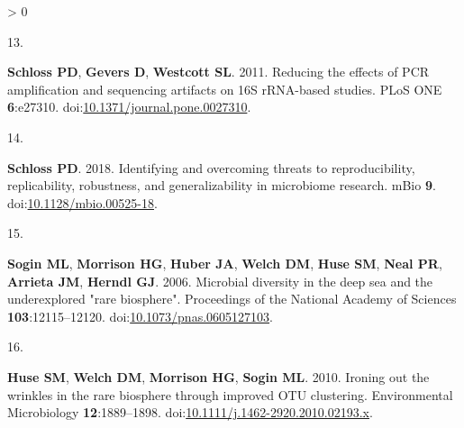 \documentclass[
]{article}
\newlength{\cslhangindent}
\newlength{\csllabelwidth}
\newenvironment{CSLReferences}[3] %
 {%
  \setlength{\parindent}{0pt}
  \ifodd #1 \everypar{\setlength{\hangindent}{\cslhangindent}}\ignorespaces\fi
  \ifnum #2 > 0
  \setlength{\parskip}{#2\baselineskip}
  \fi
 }%
 {}
\newcommand{\CSLLeftMargin}[1]{\parbox[t]{\csllabelwidth}{#1}}
\newcommand{\CSLRightInline}[1]{\parbox[t]{\linewidth - \csllabelwidth}{#1}}
\begin{document}
\begin{CSLReferences}{0}{0}
{{NR}, \textbf{Chia N}, \textbf{Fierer N}, \textbf{White O}, \textbf{Cani
PD}, \textbf{Gajer P}, \textbf{Strandwitz P}, \textbf{Kashyap P},
\textbf{Dutton R}, \textbf{Park RS}, \textbf{Xavier RJ}, \textbf{Mills
RH}, \textbf{Krajmalnik-Brown R}, \textbf{Ley R}, \textbf{Owens SM},
\textbf{Klemmer S}, \textbf{Matamoros S}, \textbf{Mirarab S},
\textbf{Moorman S}, \textbf{Holmes S}, \textbf{Schwartz T},
\textbf{Eshoo-Anton TW}, \textbf{Vigers T}, \textbf{Pandey V},
\textbf{Treuren WV}, \textbf{Fang X}, \textbf{Xu ZZ}, \textbf{Jarmusch
A}, \textbf{Geier J}, \textbf{Reeve N}, \textbf{Silva R},
\textbf{Kopylova E}, \textbf{Nguyen D}, \textbf{Sanders K},
\textbf{Benitez RAS}, \textbf{Heale AC}, \textbf{Abramson M},
\textbf{Waldispühl J}, \textbf{Butyaev A}, \textbf{Drogaris C},
\textbf{Nazarova E}, \textbf{Ball M}, \textbf{Gunderson B}. 2018.
American gut: An open platform for citizen science microbiome research.
{mSystems} \textbf{3}.
doi:\href{https://doi.org/10.1128/msystems.00031-18}{10.1128/msystems.00031-18}.}

\leavevmode\hypertarget{ref-Schloss2011}{}%
\CSLLeftMargin{13. }
\CSLRightInline{\textbf{Schloss PD}, \textbf{Gevers D}, \textbf{Westcott
SL}. 2011. Reducing the effects of {PCR} amplification and sequencing
artifacts on 16S {rRNA}-based studies. {PLoS} {ONE} \textbf{6}:e27310.
doi:\href{https://doi.org/10.1371/journal.pone.0027310}{10.1371/journal.pone.0027310}.}

\leavevmode\hypertarget{ref-Schloss2018}{}%
\CSLLeftMargin{14. }
\CSLRightInline{\textbf{Schloss PD}. 2018. Identifying and overcoming
threats to reproducibility, replicability, robustness, and
generalizability in microbiome research. {mBio} \textbf{9}.
doi:\href{https://doi.org/10.1128/mbio.00525-18}{10.1128/mbio.00525-18}.}

\leavevmode\hypertarget{ref-Sogin2006}{}%
\CSLLeftMargin{15. }
\CSLRightInline{\textbf{Sogin ML}, \textbf{Morrison HG}, \textbf{Huber
JA}, \textbf{Welch DM}, \textbf{Huse SM}, \textbf{Neal PR},
\textbf{Arrieta JM}, \textbf{Herndl GJ}. 2006. Microbial diversity in
the deep sea and the underexplored "rare biosphere". Proceedings of the
National Academy of Sciences \textbf{103}:12115--12120.
doi:\href{https://doi.org/10.1073/pnas.0605127103}{10.1073/pnas.0605127103}.}

\leavevmode\hypertarget{ref-Huse2010}{}%
\CSLLeftMargin{16. }
\CSLRightInline{\textbf{Huse SM}, \textbf{Welch DM}, \textbf{Morrison
HG}, \textbf{Sogin ML}. 2010. Ironing out the wrinkles in the rare
biosphere through improved {OTU} clustering. Environmental Microbiology
\textbf{12}:1889--1898.
doi:\href{https://doi.org/10.1111/j.1462-2920.2010.02193.x}{10.1111/j.1462-2920.2010.02193.x}.}


\end{CSLReferences}
\end{document}
